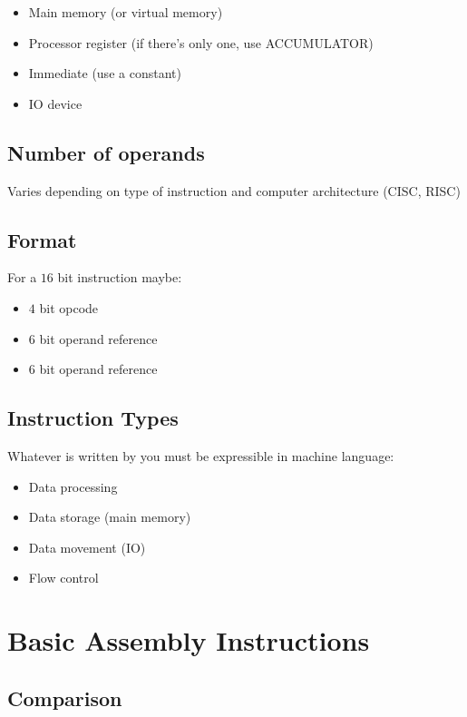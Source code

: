\begin{itemize}
	\item Main memory (or virtual memory)
	\item Processor register (if there's only one, use ACCUMULATOR)
	\item Immediate (use a constant)
	\item IO device
\end{itemize}

\subsection{Number of operands}\label{sub:number_of_operands}

Varies depending on type of instruction and computer architecture (CISC, RISC)

\subsection{Format}\label{sub:format}

For a \(16\) bit instruction maybe:
\begin{itemize}
	\item \(4\) bit opcode
	\item \(6\) bit operand reference
	\item \(6\) bit operand reference
\end{itemize}

\subsection{Instruction Types}\label{sub:instruction_types}

Whatever is written by you must be expressible in machine language:
\begin{itemize}
	\item Data processing
	\item Data storage (main memory)
	\item Data movement (IO)
	\item Flow control
\end{itemize}

\section{Basic Assembly Instructions}\label{sec:basic_assembly_instructions}

\subsection{Comparison}\label{sub:comparison}

